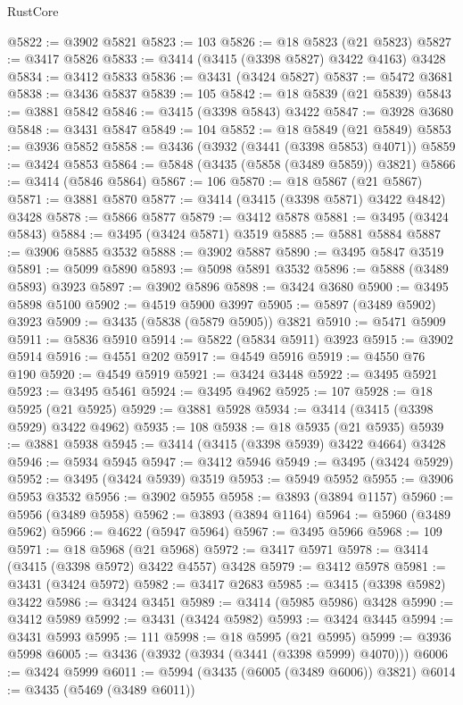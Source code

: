 \begin{lexlean}{RustCore}
\begin{coremodule}
@5822 := @3902 @5821
@5823 := 103
@5826 := @18 @5823 (@21 @5823)
@5827 := @3417 @5826
@5833 := @3414 (@3415 (@3398 @5827) @3422 @4163) @3428
@5834 := @3412 @5833
@5836 := @3431 (@3424 @5827)
@5837 := @5472 @3681
@5838 := @3436 @5837
@5839 := 105
@5842 := @18 @5839 (@21 @5839)
@5843 := @3881 @5842
@5846 := @3415 (@3398 @5843) @3422
@5847 := @3928 @3680
@5848 := @3431 @5847
@5849 := 104
@5852 := @18 @5849 (@21 @5849)
@5853 := @3936 @5852
@5858 := @3436 (@3932 (@3441 (@3398 @5853) @4071))
@5859 := @3424 @5853
@5864 := @5848 (@3435 (@5858 (@3489 @5859)) @3821)
@5866 := @3414 (@5846 @5864)
@5867 := 106
@5870 := @18 @5867 (@21 @5867)
@5871 := @3881 @5870
@5877 := @3414 (@3415 (@3398 @5871) @3422 @4842) @3428
@5878 := @5866 @5877
@5879 := @3412 @5878
@5881 := @3495 (@3424 @5843)
@5884 := @3495 (@3424 @5871) @3519
@5885 := @5881 @5884
@5887 := @3906 @5885 @3532
@5888 := @3902 @5887
@5890 := @3495 @5847 @3519
@5891 := @5099 @5890
@5893 := @5098 @5891 @3532
@5896 := @5888 (@3489 @5893) @3923
@5897 := @3902 @5896
@5898 := @3424 @3680
@5900 := @3495 @5898 @5100
@5902 := @4519 @5900 @3997
@5905 := @5897 (@3489 @5902) @3923
@5909 := @3435 (@5838 (@5879 @5905)) @3821
@5910 := @5471 @5909
@5911 := @5836 @5910
@5914 := @5822 (@5834 @5911) @3923
@5915 := @3902 @5914
@5916 := @4551 @202
@5917 := @4549 @5916
@5919 := @4550 @76 @190
@5920 := @4549 @5919
@5921 := @3424 @3448
@5922 := @3495 @5921
@5923 := @3495 @5461
@5924 := @3495 @4962
@5925 := 107
@5928 := @18 @5925 (@21 @5925)
@5929 := @3881 @5928
@5934 := @3414 (@3415 (@3398 @5929) @3422 @4962)
@5935 := 108
@5938 := @18 @5935 (@21 @5935)
@5939 := @3881 @5938
@5945 := @3414 (@3415 (@3398 @5939) @3422 @4664) @3428
@5946 := @5934 @5945
@5947 := @3412 @5946
@5949 := @3495 (@3424 @5929)
@5952 := @3495 (@3424 @5939) @3519
@5953 := @5949 @5952
@5955 := @3906 @5953 @3532
@5956 := @3902 @5955
@5958 := @3893 (@3894 @1157)
@5960 := @5956 (@3489 @5958)
@5962 := @3893 (@3894 @1164)
@5964 := @5960 (@3489 @5962)
@5966 := @4622 (@5947 @5964)
@5967 := @3495 @5966
@5968 := 109
@5971 := @18 @5968 (@21 @5968)
@5972 := @3417 @5971
@5978 := @3414 (@3415 (@3398 @5972) @3422 @4557) @3428
@5979 := @3412 @5978
@5981 := @3431 (@3424 @5972)
@5982 := @3417 @2683
@5985 := @3415 (@3398 @5982) @3422
@5986 := @3424 @3451
@5989 := @3414 (@5985 @5986) @3428
@5990 := @3412 @5989
@5992 := @3431 (@3424 @5982)
@5993 := @3424 @3445
@5994 := @3431 @5993
@5995 := 111
@5998 := @18 @5995 (@21 @5995)
@5999 := @3936 @5998
@6005 := @3436 (@3932 (@3934 (@3441 (@3398 @5999) @4070)))
@6006 := @3424 @5999
@6011 := @5994 (@3435 (@6005 (@3489 @6006)) @3821)
@6014 := @3435 (@5469 (@3489 @6011))

\end{coremodule}
\end{lexlean}
